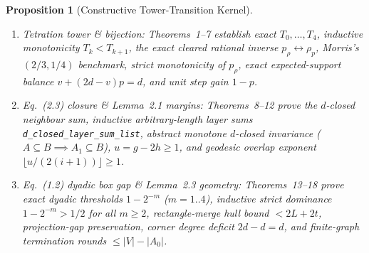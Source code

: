\documentclass[11pt,twocolumn]{article}
\newtheorem{proposition}{Proposition}
\begin{document}
\begin{proposition}[Constructive Tower-Transition Kernel]\label{prop:lean}
\leavevmode
\begin{enumerate}[leftmargin=*,nosep]
  \item \emph{Tetration tower \& bijection:} Theorems~1--7 establish exact $T_0,\dots,T_4$, inductive monotonicity $T_k < T_{k+1}$, the exact cleared rational inverse $p_\rho \leftrightarrow \rho_p$, Morris's $(2/3,1/4)$ benchmark, strict monotonicity of $p_\rho$, exact expected-support balance $v+(2d-v)p=d$, and unit step gain $1-p$.
  \item \emph{Eq.~(2.3) closure \& Lemma~2.1 margins:} Theorems~8--12 prove the $d$-closed neighbour sum, inductive arbitrary-length layer sums \texttt{d\_closed\_layer\_sum\_list}, abstract monotone $d$-closed invariance ($A \subseteq B \implies A_1 \subseteq B$), $u = g-2h \ge 1$, and geodesic overlap exponent $\lfloor u/(2(i+1))\rfloor \ge 1$.
  \item \emph{Eq.~(1.2) dyadic box gap \& Lemma~2.3 geometry:} Theorems~13--18 prove exact dyadic thresholds $1-2^{-m}$ ($m=1..4$), inductive strict dominance $1-2^{-m} > 1/2$ for all $m \ge 2$, rectangle-merge hull bound $< 2L+2t$, projection-gap preservation, corner degree deficit $2d-d=d$, and finite-graph termination rounds $\le |V|-|A_0|$.
\end{enumerate}
\end{proposition}
\end{document}
